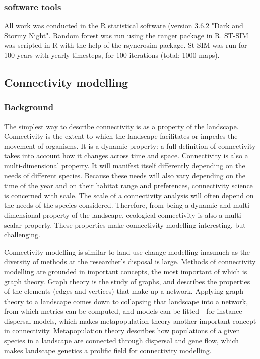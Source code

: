 \subsubsection{software tools}
All work was conducted in the R statistical software (version 3.6.2 "Dark and Stormy Night". Random forest was run using the ranger package in R. ST-SIM was scripted in R with the help of the rsyncrosim package. St-SIM was run for 100 years with yearly timesteps, for 100 iterations (total: 1000 maps).\\

\subsection{Connectivity modelling}

\subsubsection{Background}
The simplest way to describe connectivity is as a property of the landscape. Connectivity is the extent to which the landscape facilitates or impedes the movement of organisms. It is a dynamic property: a full definition of connectivity takes into account how it changes across time and space. Connectivity is also a multi-dimensional property. It will manifest itself differently depending on the needs of different species. Because these needs will also vary depending on the time of the year and on their habitat range and preferences, connectivity science is concerned with scale. The scale of a connectivity analysis will often depend on the needs of the species considered. Therefore, from being a dynamic and multi-dimensional property of the landscape, ecological connectivity is also a multi-scalar property. These properties make connectivity modelling interesting, but challenging.

Connectivity modelling is similar to land use change modelling inasmuch as the diversity of methods at the researcher’s disposal is large.  Methods of connectivity modelling are grounded in important concepts, the most important of which is graph theory. Graph theory is the study of graphs, and describes the properties of the elements (edges and vertices) that make up a network. Applying graph theory to a landscape comes down to collapsing that landscape into a network, from which metrics can be computed, and models can be fitted - for instance dispersal models, which makes metapopulation theory another important concept in connectivity. Metapopulation theory describes how populations of a given species in a landscape are connected through dispersal and gene flow, which makes landscape genetics a prolific field for connectivity modelling.

